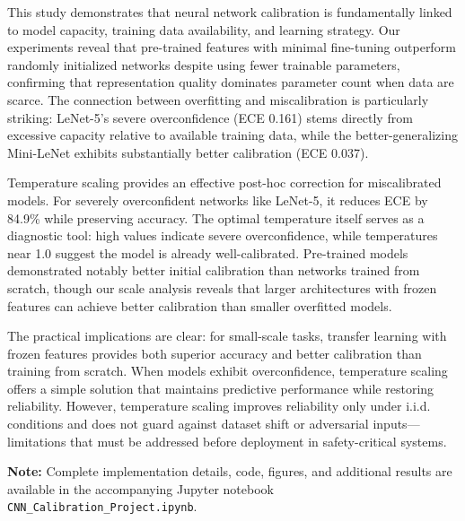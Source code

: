 \documentclass[10pt,twocolumn]{article}
\begin{document}
This study demonstrates that neural network calibration is fundamentally linked to model capacity, training data availability, and learning strategy. Our experiments reveal that pre-trained features with minimal fine-tuning outperform randomly initialized networks despite using fewer trainable parameters, confirming that representation quality dominates parameter count when data are scarce. The connection between overfitting and miscalibration is particularly striking: LeNet-5's severe overconfidence (ECE 0.161) stems directly from excessive capacity relative to available training data, while the better-generalizing Mini-LeNet exhibits substantially better calibration (ECE 0.037).

Temperature scaling provides an effective post-hoc correction for miscalibrated models. For severely overconfident networks like LeNet-5, it reduces ECE by 84.9\% while preserving accuracy. The optimal temperature itself serves as a diagnostic tool: high values indicate severe overconfidence, while temperatures near 1.0 suggest the model is already well-calibrated. Pre-trained models demonstrated notably better initial calibration than networks trained from scratch, though our scale analysis reveals that larger architectures with frozen features can achieve better calibration than smaller overfitted models.

The practical implications are clear: for small-scale tasks, transfer learning with frozen features provides both superior accuracy and better calibration than training from scratch. When models exhibit overconfidence, temperature scaling offers a simple solution that maintains predictive performance while restoring reliability. However, temperature scaling improves reliability only under i.i.d. conditions and does not guard against dataset shift or adversarial inputs—limitations that must be addressed before deployment in safety-critical systems.



\small

\normalsize

\vspace{0.5em}
\noindent\textbf{Note:} Complete implementation details, code, figures, and additional results are available in the accompanying Jupyter notebook \texttt{CNN\_Calibration\_Project.ipynb}.
\end{document}
